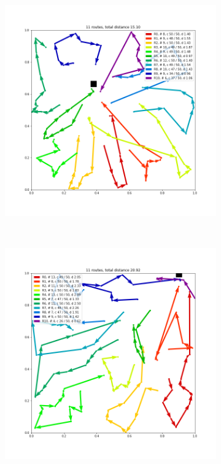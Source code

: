 \begin{figure}
    \begin{subfigure}[b]{0.49\linewidth}
        \centerline{\includegraphics[trim={50 70 50 50},clip,width=\linewidth]{./images/cvrp_2}}
\caption{}
    \end{subfigure}
    ~
    \begin{subfigure}[b]{0.49\linewidth}
        \centerline{\includegraphics[trim={50 70 50 50},clip,width=\linewidth]{./images/cvrp_3}}
\caption{}
    \end{subfigure}
    

\end{figure}
